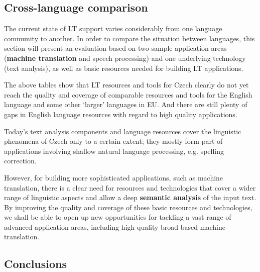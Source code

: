 \begin{multicols}{2}
\subsection{Cross-language comparison}
    The current state of LT support varies considerably from one language community to another. In order to compare the situation between languages, this section will present an evaluation based on two sample application areas (\textbf{machine translation} and speech processing) and one underlying technology (text analysis), as well as basic resources needed for building LT applications.

The above tables show that LT resources and tools for Czech clearly do not yet reach the quality and coverage of comparable resources and tools for the English language and some other ‘larger’ languages in EU. And there are still plenty of gaps in English language resources with regard to high quality applications.

Today’s text analysis components and language resources cover the linguistic phenomena of Czech only to a certain extent; they mostly form part of applications involving shallow natural language processing, e.g. spelling correction.

However, for building more sophisticated applications, such as machine translation, there is a clear need for resources and technologies that cover a wider range of linguistic aspects and allow a deep \textbf{semantic analysis} of the input text. By improving the quality and coverage of these basic resources and technologies, we shall be able to open up new opportunities for tackling a vast range of advanced application areas, including high-quality broad-based machine translation.

\subsection{Conclusions}


\end{multicols}

